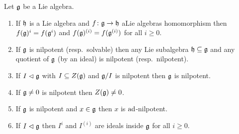 \begin{prop}
 Let $\mathfrak{g}$ be a Lie algebra.
 \begin{enumerate}
  \item
   If $\mathfrak{h}$ is a Lie algebra and $f \colon \mathfrak{g} \to \mathfrak{h}$ aLie algebras homomorphism then $f(\mathfrak{g})^i = f(\mathfrak{g}^i)$ and $f(\mathfrak{g})^{(i)} = f(\mathfrak{g}^{(i)})$ for all $i \geq 0$.
  \item
   If $\mathfrak{g}$ is nilpotent (resp.\ solvable) then any Lie subalgebra $\mathfrak{h} \subseteq \mathfrak{g}$ and any quotient of $\mathfrak{g}$ (by an ideal) is nilpotent (resp.\ nilpotent).
  \item
   If $I \vartriangleleft \mathfrak{g}$ with $I \subseteq Z(\mathfrak{g})$ and $\mathfrak{g}/I$ is nilpotent then $\mathfrak{g}$ is nilpotent.
  \item
   If $\mathfrak{g} \neq 0$ is nilpotent then $Z(\mathfrak{g}) \neq 0$.
  \item
   If $\mathfrak{g}$ is nilpotent and $x \in \mathfrak{g}$ then $x$ is $\operatorname{ad}$-nilpotent.
  \item
   If $I \vartriangleleft \mathfrak{g}$ then $I^i$ and $I^{(i)}$ are ideals inside $\mathfrak{g}$ for all $i \geq 0$.
 \end{enumerate}
\end{prop}
